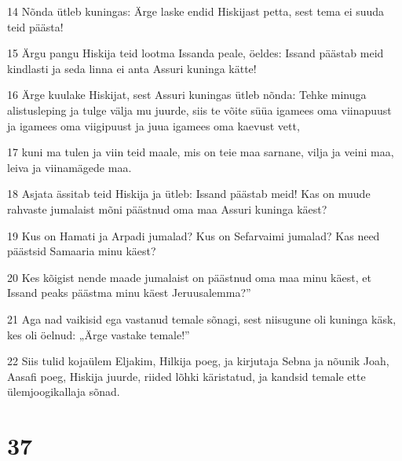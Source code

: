 \par 14 Nõnda ütleb kuningas: Ärge laske endid Hiskijast petta, sest tema ei suuda teid päästa!
\par 15 Ärgu pangu Hiskija teid lootma Issanda peale, öeldes: Issand päästab meid kindlasti ja seda linna ei anta Assuri kuninga kätte!
\par 16 Ärge kuulake Hiskijat, sest Assuri kuningas ütleb nõnda: Tehke minuga alistusleping ja tulge välja mu juurde, siis te võite süüa igamees oma viinapuust ja igamees oma viigipuust ja juua igamees oma kaevust vett,
\par 17 kuni ma tulen ja viin teid maale, mis on teie maa sarnane, vilja ja veini maa, leiva ja viinamägede maa.
\par 18 Asjata ässitab teid Hiskija ja ütleb: Issand päästab meid! Kas on muude rahvaste jumalaist mõni päästnud oma maa Assuri kuninga käest?
\par 19 Kus on Hamati ja Arpadi jumalad? Kus on Sefarvaimi jumalad? Kas need päästsid Samaaria minu käest?
\par 20 Kes kõigist nende maade jumalaist on päästnud oma maa minu käest, et Issand peaks päästma minu käest Jeruusalemma?”
\par 21 Aga nad vaikisid ega vastanud temale sõnagi, sest niisugune oli kuninga käsk, kes oli öelnud: „Ärge vastake temale!”
\par 22 Siis tulid kojaülem Eljakim, Hilkija poeg, ja kirjutaja Sebna ja nõunik Joah, Aasafi poeg, Hiskija juurde, riided lõhki käristatud, ja kandsid temale ette ülemjoogikallaja sõnad.

\chapter{37}


